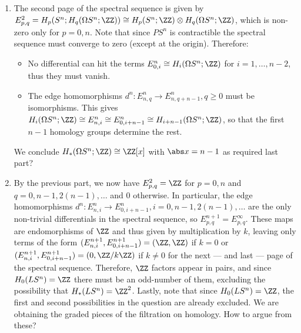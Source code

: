 \begin{enumerate}
    
    
    \item The second page of the spectral sequence is given by $E^2_{p,q}=H_p(S^n;H_q(\Omega S^n;\ZZ))\cong H_p(S^n;\ZZ)\otimes H_q(\Omega S^n;\ZZ)$, which is non-zero only for $p=0,n$. Note that since $PS^n$ is contractible the spectral sequence must converge to zero (except at the origin). Therefore:
    \begin{itemize}
        \item No differential can hit the terms $E^n_{0,i}\cong H_i(\Omega S^n;\ZZ)$ for $i=1,\dots,n-2$, thus they must vanish.
        \item The edge homomorphisms $d^n:E^n_{n,q}\to E^n_{n,q+n-1}, q\geq0$ must be isomorphisms. This gives $H_i(\Omega S^n;\ZZ)\cong E^n_{n,i}\cong E^n_{0,i+n-1}\cong H_{i+n-1}(\Omega S^n;\ZZ)$, so that the first $n-1$ homology groups determine the rest. 
    \end{itemize}
    We conclude $H_*(\Omega S^n;\ZZ)\cong \ZZ[x]$ with $\abs x=n-1$ as required {\color{red} last part?}
    
    \item By the previous part, we now have $E^2_{p,q}=\ZZ$ for $p=0,n$ and $q=0,n-1,2(n-1),\dots$ and $0$ otherwise. In particular, the edge homomorphisms $d^n:E^n_{n,i}\to E^n_{0,i+n-1}, i=0,n-1,2(n-1),\dots$ are the only non-trivial differentials in the spectral sequence, so $E^{n+1}_{p,q}=E^\infty_{p,q}$.  These maps are endomorphisms of $\ZZ$ and thus given by multiplication by $k$, leaving only terms of the form $(E^{n+1}_{n,i},E^{n+1}_{0,i+n-1})=(\ZZ,\ZZ)$ if $k=0$ or $(E^{n+1}_{n,i},E^{n+1}_{0,i+n-1})=(0,\ZZ/k\ZZ)$ if $k\neq 0$ for the next --- and last --- page of the spectral sequence. Therefore, $\ZZ$ factors appear in pairs, and since $H_0(LS^n)=\ZZ$ there must be an odd-number of them, excluding the possibility that $H_*(LS^n)=\ZZ^2$. Lastly, note that since $H_0(LS^n)=\ZZ$, the first and second possibilities in the question are already excluded. {\color{red}We are obtaining the graded pieces of the filtration on homology. How to argue from these?}
    

\end{enumerate}
